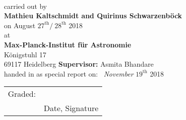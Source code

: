 
\begin{titlepage}
	\begin{center}
		\makeatletter
		
		\thispagestyle{empty}
		
		\huge\textbf{\@title} \\
		\vfill
		\large carried out by \\
		\Large\textbf{Mathieu Kaltschmidt and 
			Quirinus Schwarzenböck} \\
		\vspace{2mm}
		\large{on August $27^{\text{th}} / \ 28^{\text{th}}$} 2018 \\
		\vfill 
		\large{at} \\
		\Large\textbf{Max-Planck-Institut für Astronomie} \\
				\vspace{2mm}
		\large Königstuhl 17\\
		69117 Heidelberg
		\vfill
		\Large
		\textbf{Supervisor:} Asmita Bhandare \\
		\vfill
	   handed in as special report on: \  \textit{November} $19^{\text{th}}$ 2018 \\
	   \vfill
	   
	   \begin{tabular}{@{}p{.5in}p{4in}@{}}
			\vspace{-15pt}Graded: & \hspace{8pt}\hrulefill \\
			& \vspace{-13pt}\hspace{10pt}\normalsize Date, Signature \\
	   \end{tabular}
		\makeatother
	\end{center}
\blankpage
\end{titlepage}
